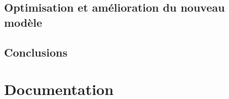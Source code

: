 \subsection{Optimisation et amélioration du nouveau modèle}
\subsection{Conclusions}


\section{Documentation}



%
%
%